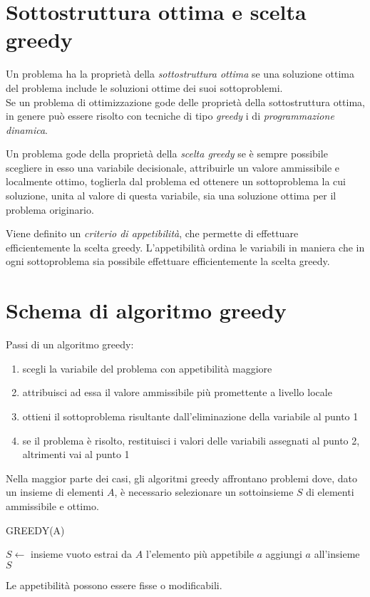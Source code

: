 \documentclass[11pt]{book}
\begin{document}
\section{Sottostruttura ottima e scelta greedy}
Un problema ha la proprietà della \textit{sottostruttura ottima} se una soluzione ottima del problema include le soluzioni 
ottime dei suoi sottoproblemi.\\
Se un problema di ottimizzazione gode delle proprietà della sottostruttura ottima, in genere può essere risolto con tecniche 
di tipo \textit{greedy} i di \textit{programmazione dinamica}.

Un problema gode della proprietà della \textit{scelta greedy} se è sempre possibile scegliere in esso una variabile decisionale, 
attribuirle un valore ammissibile e localmente ottimo, toglierla dal problema ed ottenere un sottoproblema la cui soluzione, 
unita al valore di questa variabile, sia una soluzione ottima per il problema originario.

Viene definito un \textit{criterio di appetibilità}, che permette di effettuare efficientemente la scelta greedy. L'appetibilità 
ordina le variabili in maniera che in ogni sottoproblema sia possibile effettuare efficientemente la scelta greedy.
\section{Schema di algoritmo greedy}
Passi di un algoritmo greedy:
\begin{enumerate}
    \item scegli la variabile del problema con appetibilità maggiore 
    \item attribuisci ad essa il valore ammissibile più promettente a livello locale 
    \item ottieni il sottoproblema risultante dall'eliminazione della variabile al punto 1
    \item se il problema è risolto, restituisci i valori delle variabili assegnati al punto 2, altrimenti vai al punto 1 
\end{enumerate}
Nella maggior parte dei casi, gli algoritmi greedy affrontano problemi dove, dato un insieme di elementi $A$, è necessario 
selezionare un sottoinsieme $S$ di elementi ammissibile e ottimo.
\begin{algorithm}
        \caption{GREEDY(A)}
    \begin{algorithmic}
        \State $S \gets$ insieme vuoto
            \State estrai da $A$ l'elemento più appetibile $a$
                \State aggiungi $a$ all'insieme $S$
            \EndIf 
        \EndWhile
    \end{algorithmic}
\end{algorithm}
Le appetibilità possono essere fisse o modificabili.
\end{document}
